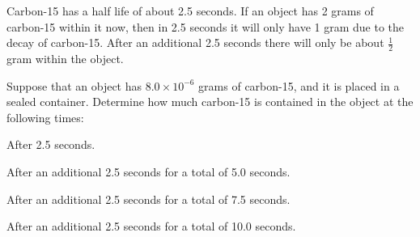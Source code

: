 
\begin{problem}
\item Carbon-15 has a half life of about 2.5 seconds. If an object has
  2 grams of carbon-15 within it now, then in 2.5 seconds it will only
  have 1 gram due to the decay of carbon-15. After an additional 2.5
  seconds there will only be about $\frac{1}{2}$ gram within the
  object.

  Suppose that an object has $8.0\times 10^{-6}$ grams of carbon-15,
  and it is placed in a sealed container. Determine how much carbon-15
  is contained in the object at the following times:

  \begin{subproblem}
  \item After 2.5 seconds.
    \vfill
  \item After an additional 2.5 seconds for a total of 5.0 seconds.
    \vfill
  \item After an additional 2.5 seconds for a total of 7.5 seconds.
    \vfill
  \item After an additional 2.5 seconds for a total of 10.0 seconds.
    \vfill
  \end{subproblem}
\end{problem}


